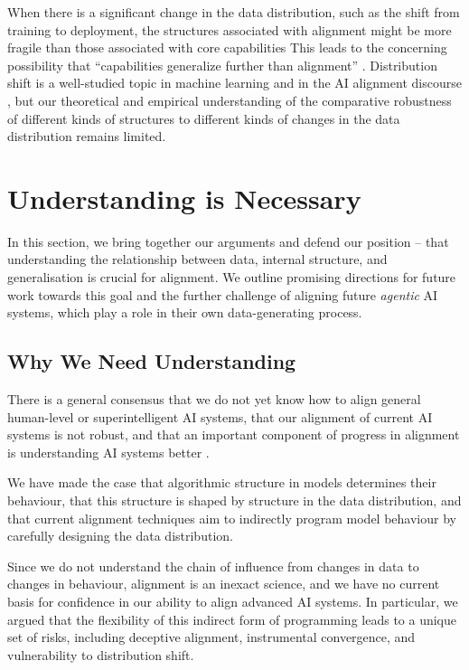 When there is a significant change in the data distribution, such as the shift from training to deployment, the structures associated with alignment might be more fragile than those associated with core capabilities
% 
This leads to the concerning possibility that ``capabilities generalize further than alignment'' \citep{soares2023}. Distribution shift is a well-studied topic in machine learning and in the AI alignment discourse \citep[\S 7]{amodei2016concrete}, but our theoretical and empirical understanding of the comparative robustness of different kinds of structures to different kinds of changes in the data distribution remains limited.
% 










\section{Understanding is Necessary}\label{section:understanding}

In this section, we bring together our arguments and defend our position -- that understanding the relationship between data, internal structure, and generalisation is crucial for alignment. We outline promising directions for future work towards this goal and the further challenge of aligning future \emph{agentic} AI systems, which play a role in their own data-generating process.

\subsection{Why We Need Understanding}

There is a general consensus that we do not yet know how to align general human-level or superintelligent AI systems, that our alignment of current AI systems is not robust, and that an important component of progress in alignment is understanding AI systems better \citep{bengio2024internationalscientificreportsafety,anwar2024foundationalchallengesassuringalignment}.

We have made the case that algorithmic structure in models determines their behaviour, that this structure is shaped by structure in the data distribution, and that current alignment techniques aim to indirectly program model behaviour by carefully designing the data distribution.

Since we do not understand the chain of influence from changes in data to changes in behaviour, alignment is an inexact science, and we have no current basis for confidence in our ability to align advanced AI systems. In particular, we argued that the flexibility of this indirect form of programming leads to a unique set of risks, including deceptive alignment, instrumental convergence, and vulnerability to distribution shift. 

